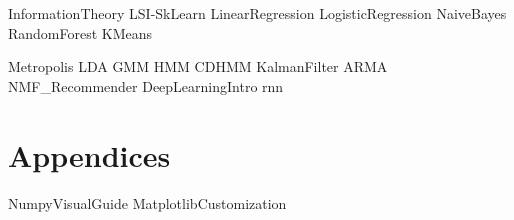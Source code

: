 \documentclass[opener-c,labs,yellow,nociteref]{HJnewsiambook}
\begin{document}
{InformationTheory}
{LSI-SkLearn}
{LinearRegression}
{LogisticRegression}
{NaiveBayes}
{RandomForest}
{KMeans}

{Metropolis}
{LDA}
{GMM}
{HMM}
{CDHMM}
{KalmanFilter}
{ARMA}
{NMF_Recommender}
{DeepLearningIntro}
{rnn}

\part{Appendices}
\begin{appendices}
{NumpyVisualGuide}
{MatplotlibCustomization}
\end{appendices}



\end{document}
